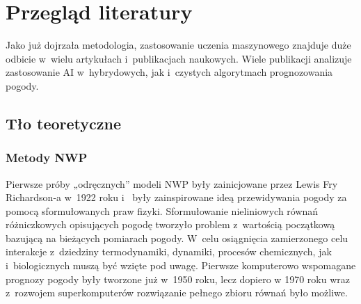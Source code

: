 

\section{Przegląd literatury}

Jako już dojrzała metodologia, zastosowanie uczenia maszynowego 
znajduje duże odbicie w~wielu artykułach i~publikacjach naukowych. 
Wiele publikacji analizuje zastosowanie AI w~hybrydowych, jak i~czystych 
algorytmach prognozowania pogody. 


\subsection{Tło teoretyczne}


\subsubsection*{Metody NWP}

Pierwsze próby „odręcznych'' modeli NWP były zainicjowane przez Lewis Fry Richardson-a w~1922 roku i~
były zainspirowane ideą przewidywania pogody za pomocą sformułowanych praw fizyki. Sformułowanie
nieliniowych równań różniczkowych opisujących pogodę tworzyło problem z~wartością początkową bazującą
na bieżących pomiarach pogody. W~celu osiągnięcia zamierzonego celu interakcje z~dziedziny 
termodynamiki, dynamiki, procesów chemicznych, jak i~biologicznych muszą być wzięte pod uwagę.
Pierwsze komputerowo wspomagane prognozy pogody były tworzone już w~1950 roku, lecz dopiero
w 1970 roku wraz z~rozwojem superkomputerów rozwiązanie pełnego zbioru równań było możliwe.

